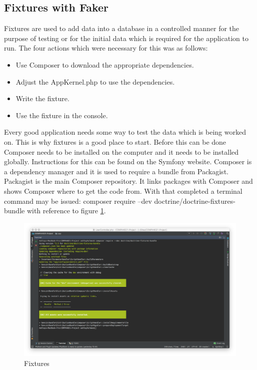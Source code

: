 \subsection{Fixtures with Faker}

Fixtures are used to add data into a database in a controlled manner for the purpose of testing or for the initial data which is required for the application to run. The four actions which were necessary for this was as follows:

\begin{itemize}
  \item Use Composer to download the appropriate dependencies.
    \item Adjust the AppKernel.php to use the dependencies.
      \item Write the fixture.
        \item Use the fixture in the console.
\end{itemize}

Every good application needs some way to test the data which is being worked on. This is why fixtures is a good place to start. Before this can be done Composer needs to be installed on the computer and it needs to be installed globally. Instructions for this can be found on the Symfony website. Composer is a dependency manager and it is used to require a bundle from Packagist. Packagist is the main Composer repository. It links packages with Composer and shows Composer where to get the code from. With that completed a terminal command may be issued: composer require --dev doctrine/doctrine-fixtures-bundle with reference to figure \ref{fig:Fixtures}.

\begin{figure}[htbp]
   \centering
   \includegraphics[width=400pt]{figures/fixtures.png} %
   \caption{Fixtures}
   \label{fig:Fixtures}
\end{figure}

